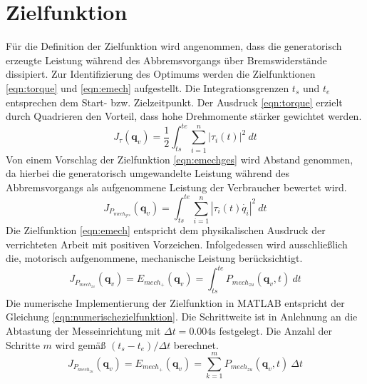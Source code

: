 \section{Zielfunktion}
Für die Definition der Zielfunktion wird angenommen, dass die generatorisch erzeugte Leistung während des Abbremsvorgangs über Bremswiderstände dissipiert. Zur Identifizierung des Optimums werden die Zielfunktionen \ref{eqn:torque} \cite[S-~1]{Hansen.2012} und \ref{eqn:emech} \cite[S.~57]{Eggers.2019} aufgestellt. Die Integrationsgrenzen $t_s$ und $t_e$ entsprechen dem Start- bzw. Zielzeitpunkt. Der Ausdruck \ref{eqn:torque} erzielt durch Quadrieren den Vorteil, dass hohe Drehmomente stärker gewichtet werden.
%
\begin{equation}
	\label{eqn:torque}
	J_{\tau}(\bm{q}_{v}) = \frac{1}{2}\int_{ts}^{te}\sum_{i=1}^{n}\left|\tau_i(t)\right|^2~dt
\end{equation}
%
Von einem Vorschlag der Zielfunktion \ref{eqn:emechges} \cite[S.~1216]{Saravanan.2008} wird Abstand genommen, da hierbei die generatorisch umgewandelte Leistung während des Abbremsvorgangs als aufgenommene Leistung der Verbraucher bewertet wird. 
%
\begin{equation}
	\label{eqn:emechges}
	J_{P_{mech_{ges}}}(\bm{q}_{v}) = \int_{ts}^{te}\sum_{i=1}^{n}\left|\tau_i(t)\dot{q_i}\right|^2~dt
\end{equation}
%
Die Zielfunktion \ref{eqn:emech} entspricht dem physikalischen Ausdruck der verrichteten Arbeit mit positiven Vorzeichen. Infolgedessen wird ausschließlich die, motorisch aufgenommene, mechanische Leistung berücksichtigt. 
%
\begin{equation}
	\label{eqn:emech}
	J_{P_{mech_{zu}}}
	(\bm{q}_{v}) 
	= E_{mech_{+}}(\bm{q}_{v}) 
	=\int_{ts}^{te}P_{mech_{zu}}(\bm{q}_{v},t)~dt
\end{equation}
%
Die numerische Implementierung der Zielfunktion in  MATLAB\textsuperscript{\textregistered} entspricht der Gleichung  \ref{eqn:numerischezielfunktion}. Die Schrittweite ist in Anlehnung an die Abtastung der Messeinrichtung  mit $\Delta t = 0.004 \text{s}$ festgelegt. Die Anzahl der Schritte $m$  wird gemäß $(t_s-t_e)/\Delta t$ berechnet.
%
\begin{equation}
	\label{eqn:numerischezielfunktion}
	J_{P_{mech_{zu}}}
	(\bm{q}_{v}) 
	= E_{mech_{+}}(\bm{q}_{v}) 
	= \sum_{k=1}^{m} P_{mech_{zu}}(\bm{q}_{v},t)~\Delta t
\end{equation}
%
